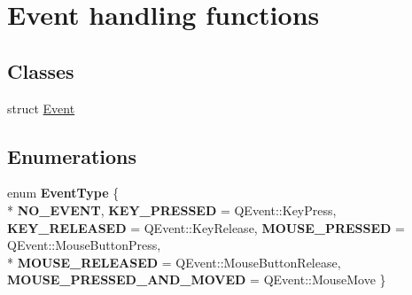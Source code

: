 \hypertarget{group___event}{\section{Event handling functions}
\label{group___event}
}
\subsection*{Classes}
\begin{DoxyCompactItemize}
\item 
struct \hyperlink{struct_d_o_1_1_event}{Event}
\end{DoxyCompactItemize}
\subsection*{Enumerations}
\begin{DoxyCompactItemize}
\item 
enum {\bfseries Event\-Type} \{ \\*
{\bfseries N\-O\-\_\-\-E\-V\-E\-N\-T}, 
{\bfseries K\-E\-Y\-\_\-\-P\-R\-E\-S\-S\-E\-D} = Q\-Event\-:\-:Key\-Press, 
{\bfseries K\-E\-Y\-\_\-\-R\-E\-L\-E\-A\-S\-E\-D} = Q\-Event\-:\-:Key\-Release, 
{\bfseries M\-O\-U\-S\-E\-\_\-\-P\-R\-E\-S\-S\-E\-D} = Q\-Event\-:\-:Mouse\-Button\-Press, 
\\*
{\bfseries M\-O\-U\-S\-E\-\_\-\-R\-E\-L\-E\-A\-S\-E\-D} = Q\-Event\-:\-:Mouse\-Button\-Release, 
{\bfseries M\-O\-U\-S\-E\-\_\-\-P\-R\-E\-S\-S\-E\-D\-\_\-\-A\-N\-D\-\_\-\-M\-O\-V\-E\-D} = Q\-Event\-:\-:Mouse\-Move
 \}
\end{DoxyCompactItemize}
